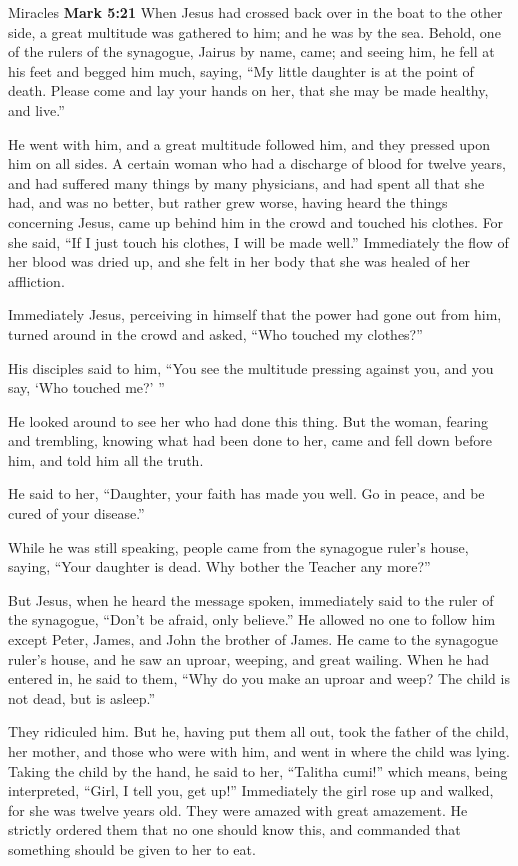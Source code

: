 \documentclass[10pt,twoside]{book}
\newcommand{\quotesize}{\normalsize{}}
\newenvironment{quotetext}{\begingroup\quotesize}{\endgroup}
\newcommand{\bible}[2]{\begin{quotetext}\textbf{#1} #2\end{quotetext}}
\newcommand{\gospelmark}[2]{\bible{Mark #1}{#2}}
\begin{document}
\begin{section}{Miracles}
\gospelmark{5:21}{
  When Jesus had crossed back over in the boat to the other side, a great multitude was gathered to him; and he was by the sea.   Behold, one of the rulers of the synagogue, Jairus by name, came; and seeing him, he fell at his feet   and begged him much, saying, ``My little daughter is at the point of death. Please come and lay your hands on her, that she may be made healthy, and live.''

  He went with him, and a great multitude followed him, and they pressed upon him on all sides.   A certain woman who had a discharge of blood for twelve years,   and had suffered many things by many physicians, and had spent all that she had, and was no better, but rather grew worse,   having heard the things concerning Jesus, came up behind him in the crowd and touched his clothes.   For she said, ``If I just touch his clothes, I will be made well.''   Immediately the flow of her blood was dried up, and she felt in her body that she was healed of her affliction.

  Immediately Jesus, perceiving in himself that the power had gone out from him, turned around in the crowd and asked, ``Who touched my clothes?''

  His disciples said to him, ``You see the multitude pressing against you, and you say, `Who touched me?' ''

  He looked around to see her who had done this thing.   But the woman, fearing and trembling, knowing what had been done to her, came and fell down before him, and told him all the truth.

  He said to her, ``Daughter, your faith has made you well. Go in peace, and be cured of your disease.''

  While he was still speaking, people came from the synagogue ruler's house, saying, ``Your daughter is dead. Why bother the Teacher any more?''

  But Jesus, when he heard the message spoken, immediately said to the ruler of the synagogue, ``Don't be afraid, only believe.''   He allowed no one to follow him except Peter, James, and John the brother of James.   He came to the synagogue ruler's house, and he saw an uproar, weeping, and great wailing.   When he had entered in, he said to them, ``Why do you make an uproar and weep? The child is not dead, but is asleep.''

  They ridiculed him. But he, having put them all out, took the father of the child, her mother, and those who were with him, and went in where the child was lying.   Taking the child by the hand, he said to her, ``Talitha cumi!'' which means, being interpreted, ``Girl, I tell you, get up!''   Immediately the girl rose up and walked, for she was twelve years old. They were amazed with great amazement.   He strictly ordered them that no one should know this, and commanded that something should be given to her to eat.}


\end{section}
\end{document}
